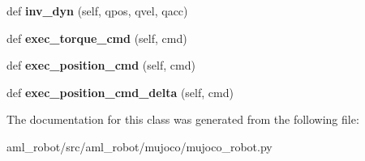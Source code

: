 \begin{DoxyCompactItemize}
def {\bfseries inv\+\_\+dyn} (self, qpos, qvel, qacc)
\item 
\hypertarget{classaml__robot_1_1mujoco_1_1mujoco__robot_1_1_mujoco_robot_ae02b2caa4858fc72d423e310c5ba3299}{}\label{classaml__robot_1_1mujoco_1_1mujoco__robot_1_1_mujoco_robot_ae02b2caa4858fc72d423e310c5ba3299} 
def {\bfseries exec\+\_\+torque\+\_\+cmd} (self, cmd)
\item 
\hypertarget{classaml__robot_1_1mujoco_1_1mujoco__robot_1_1_mujoco_robot_a67ff5c7a14bb25e8019ffffe08a8fe37}{}\label{classaml__robot_1_1mujoco_1_1mujoco__robot_1_1_mujoco_robot_a67ff5c7a14bb25e8019ffffe08a8fe37} 
def {\bfseries exec\+\_\+position\+\_\+cmd} (self, cmd)
\item 
\hypertarget{classaml__robot_1_1mujoco_1_1mujoco__robot_1_1_mujoco_robot_ae4870147d3f87826bd2237511536aff3}{}\label{classaml__robot_1_1mujoco_1_1mujoco__robot_1_1_mujoco_robot_ae4870147d3f87826bd2237511536aff3} 
def {\bfseries exec\+\_\+position\+\_\+cmd\+\_\+delta} (self, cmd)
\end{DoxyCompactItemize}


The documentation for this class was generated from the following file\+:\begin{DoxyCompactItemize}
\item 
aml\+\_\+robot/src/aml\+\_\+robot/mujoco/mujoco\+\_\+robot.\+py\end{DoxyCompactItemize}

